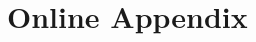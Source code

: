 \documentclass[dvipsnames,finalmode,PP]{AEA}
\begin{document}



\appendix


%

\section{Online Appendix}

\end{document}
